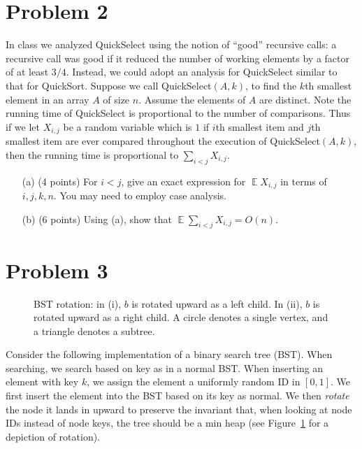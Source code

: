 \documentclass[12pt]{article}
\DeclareMathOperator*{\E}{\mathbb{E}}
\begin{document}
\section*{Problem 2}

In class we analyzed QuickSelect using the notion of ``good'' recursive calls: a recursive call was good if it reduced the number of working elements by a factor of at least $3/4$. Instead, we could adopt an analysis for QuickSelect similar to that for QuickSort. Suppose we call QuickSelect$(A,k)$, to find the $k$th smallest element in an array $A$ of size $n$. Assume the elements of $A$ are distinct. Note the running time of QuickSelect is proportional to the number of comparisons. Thus if we let $X_{i,j}$ be a random variable which is $1$ if $i$th smallest item and $j$th smallest item are ever compared throughout the execution of QuickSelect$(A,k)$, then the running time is proportional to $\sum_{i<j} X_{i,j}$.
\begin{itemize}
\item[(a)] (4 points) For $i<j$, give an exact expression for $\E X_{i,j}$ in terms of $i,j,k,n$. You may need to employ case analysis.
\item[(b)] (6 points) Using (a), show that $\E \sum_{i<j} X_{i,j} = O(n)$.
\end{itemize}

\section*{Problem 3}

\begin{figure}[!h]
\begin{center}
\end{center}
\caption{BST rotation: in (i), $b$ is rotated upward as a left child. In (ii), $b$ is rotated upward as a right child. A circle denotes a single vertex, and a triangle denotes a subtree.}\label{fig:rotate}
\end{figure}

Consider the following implementation of a binary search tree (BST). When searching, we search based on key as in a normal BST. When inserting an element with key $k$, we assign the element a uniformly random ID in $[0,1]$. We first insert the element into the BST based on its key as normal. We then {\em rotate} the node it lands in upward to preserve the invariant that, when looking at node IDs instead of node keys, the tree should be a min heap (see Figure~\ref{fig:rotate} for a depiction of rotation).
\end{document}

